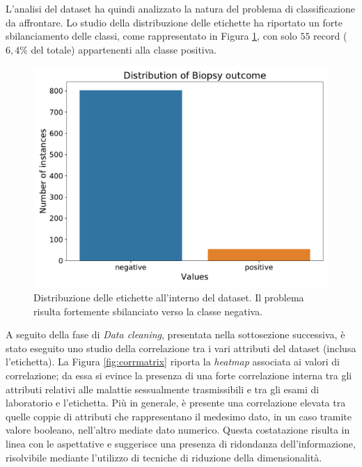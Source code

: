 L'analisi del dataset ha quindi analizzato la natura del problema di classificazione da affrontare. Lo studio della distribuzione delle etichette ha riportato un forte sbilanciamento delle classi, come rappresentato in Figura \ref{fig:biopsydistribution}, con solo $55$ record ($6,4\%$ del totale) appartenenti alla classe positiva.
\begin{figure}
	\centering
	\includegraphics[width=0.8\linewidth]{images/biopsy_distribution}
	\caption{Distribuzione delle etichette all'interno del dataset. Il problema risulta fortemente sbilanciato verso la classe negativa.}
	\label{fig:biopsydistribution}
\end{figure}
A seguito della fase di \textit{Data cleaning}, presentata nella sottosezione successiva, è stato eseguito uno studio della correlazione tra i vari attributi del dataset (inclusa l'etichetta). La Figura \ref{fig:corrmatrix} riporta la \textit{heatmap} associata ai valori di correlazione; da essa si evince la presenza di una forte correlazione interna tra gli attributi relativi alle malattie sessualmente trasmissibili e tra gli esami di laboratorio e l'etichetta. Più in generale, è presente una correlazione elevata tra quelle coppie di attributi che rappresentano il medesimo dato, in un caso tramite valore booleano, nell'altro mediate dato numerico. Questa costatazione risulta in linea con le aspettative e suggerisce una presenza di ridondanza dell'informazione, risolvibile mediante l'utilizzo di tecniche di riduzione della dimensionalità.

